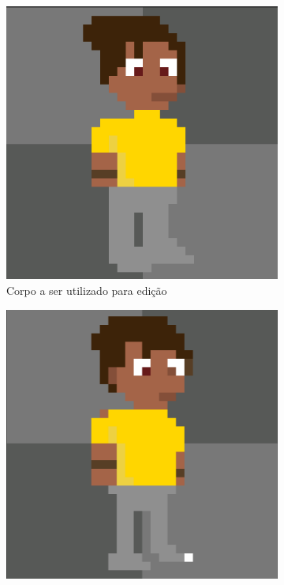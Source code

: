 \begin{figure}[htbp]
    \centering
    \caption{\small Ajuste fino nos resultados da rotação de 45 graus}
    \label{fig:pixelLabAjusteFino2}
    \begin{subfigure}{0.23\linewidth}
        \centering
        \includegraphics[width=1\linewidth]{figs/pixelLab/dia2/rot45res3.PNG}
        \caption{\small Corpo a ser utilizado para edição}
        \label{fig:pixelLabAjusteFino2a}
    \end{subfigure}
    \begin{subfigure}{0.23\linewidth}
        \centering
        \includegraphics[width=1\linewidth]{figs/pixelLab/dia2/rot45res4.PNG}

\end{subfigure}
\end{figure}
